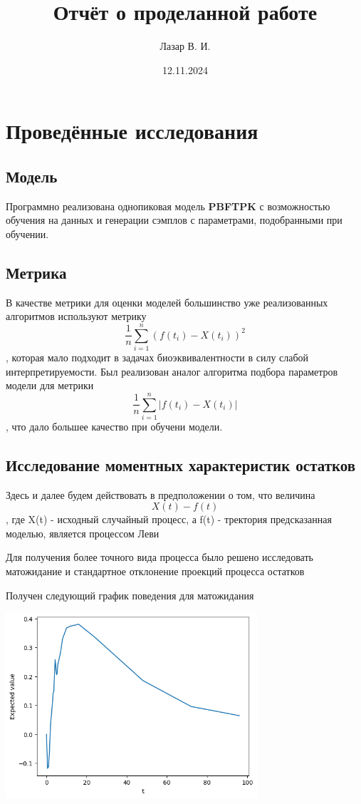 \documentclass{article}
\title{Отчёт о проделанной работе}
\author{Лазар В. И.}
\date{12.11.2024}
\begin{document}
\maketitle

\section{Проведённые исследования}

\subsection{Модель}

Программно реализована однопиковая модель \textbf{PBFTPK} с возможностью обучения на данных и генерации сэмплов с параметрами, подобранными при обучении.

\subsection{Метрика}

В качестве метрики для оценки моделей большинство уже реализованных алгоритмов используют метрику \[
	\frac{1}{n}\sum_{i=1}^{n} (f(t_i) - X(t_i))^2
\], которая мало подходит в задачах биоэквивалентности в силу слабой интерпретируемости. Был реализован аналог алгоритма подбора параметров модели для метрики
\[
	\frac{1}{n}\sum_{i=1}^{n} |f(t_i) - X(t_i)|
\], что дало большее качество при обучени модели.


\subsection{Исследование моментных характеристик остатков}

Здесь и далее будем действовать в предположении о том, что величина
\[
	X(t) - f(t)
\], где X(t) - исходный случайный процесс, а f(t) - тректория предсказанная моделью, является процессом Леви

Для получения более точного вида процесса было решено исследовать матожидание и стандартное отклонение проекций процесса остатков \newline\newline


Получен следующий график поведения для матожидания

\includegraphics[width=0.7\textwidth, left]{mean.png}
\end{document}
